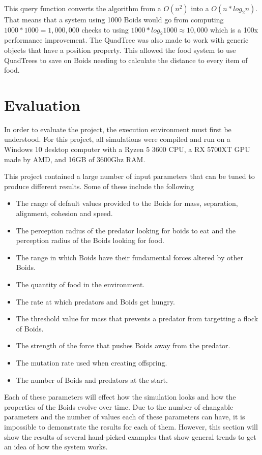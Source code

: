 \documentclass{egpubl}
\begin{document}
\par
This query function converts the algorithm from a $O( n^2 )$ into a $O(n * log_2{n})$. That means that a system using 1000 Boids would go from computing $1000 * 1000 = 1,000,000$ checks to using $1000 * log_2{1000} \approx 10,000$ which is a 100x performance improvement. The QuadTree was also made to work with generic objects that have a position property. This allowed the food system to use QuadTrees to save on Boids needing to calculate the distance to every item of food.
\section{Evaluation}
In order to evaluate the project, the execution environment must first be understood. For this project, all simulations were compiled and run on a Windows 10 desktop computer with a Ryzen 5 3600 CPU, a RX 5700XT GPU made by AMD, and 16GB of 3600Ghz RAM.
\par
This project contained a large number of input parameters that can be tuned to produce different results. Some of these include the following
\begin{itemize}
    \item The range of default values provided to the Boids for mass, separation, alignment, cohesion and speed.
    \item The perception radius of the predator looking for boids to eat and the perception radius of the Boids looking for food.
    \item The range in which Boids have their fundamental forces altered by other Boids.
    \item The quantity of food in the environment.
    \item The rate at which predators and Boids get hungry.
    \item The threshold value for mass that prevents a predator from targetting a flock of Boids. 
    \item The strength of the force that pushes Boids away from the predator.
    \item The mutation rate used when creating offspring.
    \item The number of Boids and predators at the start.
\end{itemize}
Each of these parameters will effect how the simulation looks and how the properties of the Boids evolve over time. Due to the number of changable parameters and the number of values each of these parameters can have, it is impossible to demonstrate the results for each of them. However, this section will show the results of several hand-picked examples that show general trends to get an idea of how the system works.
\end{document}
